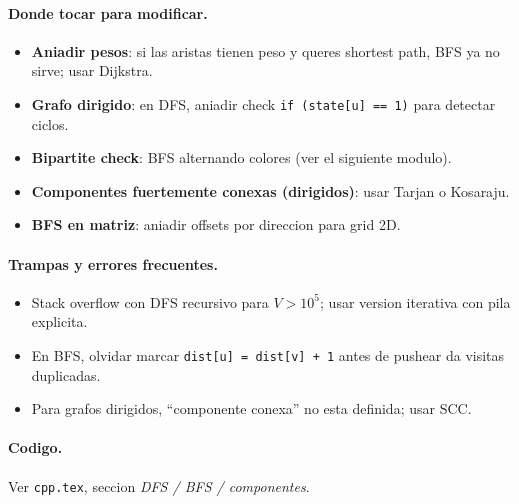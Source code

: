 \paragraph{Donde tocar para modificar.}
\begin{itemize}\setlength\itemsep{0pt}
	\item \textbf{Aniadir pesos}: si las aristas tienen peso y queres shortest path, BFS ya no sirve; usar Dijkstra.
	\item \textbf{Grafo dirigido}: en DFS, aniadir check \texttt{if (state[u] == 1)} para detectar ciclos.
	\item \textbf{Bipartite check}: BFS alternando colores (ver el siguiente modulo).
	\item \textbf{Componentes fuertemente conexas (dirigidos)}: usar Tarjan o Kosaraju.
	\item \textbf{BFS en matriz}: aniadir offsets por direccion para grid 2D.
\end{itemize}

\paragraph{Trampas y errores frecuentes.}
\begin{itemize}\setlength\itemsep{0pt}
	\item Stack overflow con DFS recursivo para $V > 10^5$; usar version iterativa con pila explicita.
	\item En BFS, olvidar marcar \texttt{dist[u] = dist[v] + 1} antes de pushear da visitas duplicadas.
	\item Para grafos dirigidos, ``componente conexa'' no esta definida; usar SCC.
\end{itemize}

\paragraph{Codigo.}
Ver \texttt{cpp.tex}, seccion \textit{DFS / BFS / componentes}.

\vspace{0.5em}
